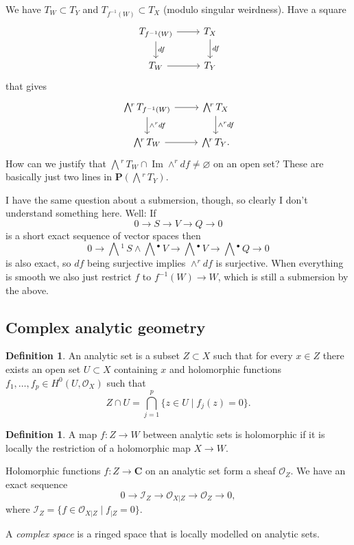 \documentclass[11pt]{amsart}
\theoremstyle{definition}
\newtheorem{defi}[theo]{Definition}
\newcommand{\cc}[1]{\mathcal{#1}}
\def\lra{\longrightarrow}
\def\CC{\mathbf{C}}
\def\PP{\mathbf{P}}
\DeclareMathOperator{\Img}{Im}
\newcommand{\ext}[1]{\bigwedge{}^{\!\!#1}\,}
\begin{document}
We have $T_W \subset T_Y$ and $T_{f^{-1}(W)} \subset T_X$ (modulo singular weirdness).
Have a square
\[
\begin{tikzcd}
T_{f^{-1}(W)} \ar[r] \ar[d,"df"] &
T_X \ar[d,"df"] \\
T_{W} \ar[r] &
T_Y
\end{tikzcd}
\]
that gives
\[
\begin{tikzcd}
\ext r T_{f^{-1}(W)} \ar[r] \ar[d,"\wedge^r df"] &
\ext r T_X \ar[d,"\wedge^r df"] \\
\ext r T_{W} \ar[r] &
\ext r T_Y.
\end{tikzcd}
\]
How can we justify that $\ext r T_W \cap \Img \wedge^r df \not= \varnothing$ on an open set?
These are basically just two lines in $\PP(\ext r T_Y)$.

I have the same question about a submersion, though, so clearly I don't understand something here.
Well: If
\[
0 \lra S \lra V \lra Q \lra 0
\]
is a short exact sequence of vector spaces then
\[
0 \lra \ext{1} S \wedge \ext\bullet V \lra \ext\bullet V \lra \ext\bullet Q \lra 0
\]
is also exact, so $df$ being surjective implies $\wedge^r df$ is surjective.
When everything is smooth we also just restrict $f$ to $f^{-1}(W) \to W$, which is still a submersion by the above.



\subsection*{Complex analytic geometry}


\begin{defi}
An analytic set is a subset $Z \subset X$ such that for every $x \in Z$ there exists an open set $U \subset X$ containing $x$ and holomorphic functions $f_1, \ldots, f_p \in H^0(U, \cc O_X)$ such that
\[
Z \cap U = \bigcap_{j=1}^p \{ z \in U \mid f_j(z) = 0 \}.
\]
\end{defi}

\begin{defi}
A map $f : Z \to W$ between analytic sets is holomorphic if it is locally the restriction of a holomorphic map $X \to W$.
\end{defi}

Holomorphic functions $f : Z \to \CC$ on an analytic set form a sheaf $\cc O_Z$.
We have an exact sequence
\[
0 \lra \cc I_Z \lra \cc O_{X|Z} \lra \cc O_Z \lra 0,
\]
where $\cc I_Z = \{ f \in \cc O_{X|Z} \mid f_{|Z} = 0 \}$.

A \emph{complex space} is a ringed space that is locally modelled on analytic sets.
\end{document}

